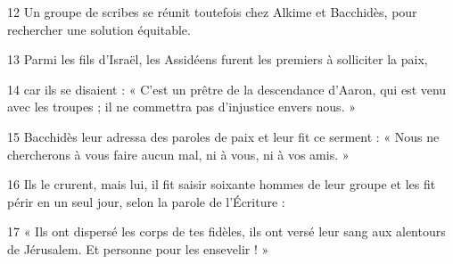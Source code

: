 
12 Un groupe de scribes se réunit toutefois chez Alkime et Bacchidès, pour rechercher une solution équitable.

13 Parmi les fils d’Israël, les Assidéens furent les premiers à solliciter la paix,

14 car ils se disaient : « C’est un prêtre de la descendance d’Aaron, qui est venu avec les troupes ; il ne commettra pas d’injustice envers nous. »

15 Bacchidès leur adressa des paroles de paix et leur fit ce serment : « Nous ne chercherons à vous faire aucun mal, ni à vous, ni à vos amis. »

16 Ils le crurent, mais lui, il fit saisir soixante hommes de leur groupe et les fit périr en un seul jour, selon la parole de l’Écriture :

17 « Ils ont dispersé les corps de tes fidèles, ils ont versé leur sang aux alentours de Jérusalem. Et personne pour les ensevelir ! »
